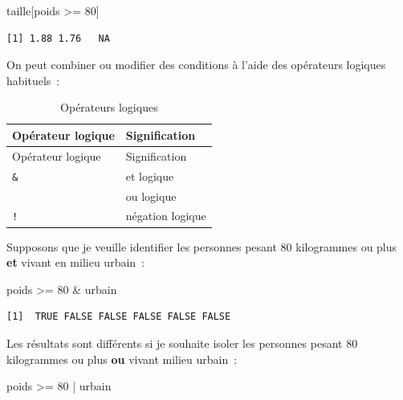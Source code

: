 \documentclass[
  letterpaper,
  DIV=11,
  numbers=noendperiod,
  oneside]{scrreprt}
\newenvironment{Shaded}{\begin{snugshade}}{\end{snugshade}}
\newcommand{\DecValTok}[1]{\textcolor[rgb]{0.68,0.00,0.00}{#1}}
\newcommand{\NormalTok}[1]{\textcolor[rgb]{0.00,0.23,0.31}{#1}}
\newcommand{\SpecialCharTok}[1]{\textcolor[rgb]{0.37,0.37,0.37}{#1}}
\begin{document}
\begin{Shaded}
\begin{Highlighting}[]
\NormalTok{taille[poids }\SpecialCharTok{\textgreater{}=} \DecValTok{80}\NormalTok{]}
\end{Highlighting}
\end{Shaded}

\begin{verbatim}
[1] 1.88 1.76   NA
\end{verbatim}

On peut combiner ou modifier des conditions à l'aide des opérateurs
logiques habituels~:

\hypertarget{tbl-operateurs-logiques}{}
\begin{longtable}[]{@{}ll@{}}
\caption{\label{tbl-operateurs-logiques}Opérateurs
logiques}\tabularnewline
\toprule()
Opérateur logique & Signification \\
\midrule()
\endfirsthead
\toprule()
Opérateur logique & Signification \\
\midrule()
\endhead
\texttt{\&} & et logique \\
\texttt{\textbar{}} & ou logique \\
\texttt{!} & négation logique \\
\bottomrule()
\end{longtable}

Supposons que je veuille identifier les personnes pesant 80 kilogrammes
ou plus \textbf{et} vivant en milieu urbain~:

\begin{Shaded}
\begin{Highlighting}[]
\NormalTok{poids }\SpecialCharTok{\textgreater{}=} \DecValTok{80} \SpecialCharTok{\&}\NormalTok{ urbain}
\end{Highlighting}
\end{Shaded}

\begin{verbatim}
[1]  TRUE FALSE FALSE FALSE FALSE FALSE
\end{verbatim}

Les résultats sont différents si je souhaite isoler les personnes pesant
80 kilogrammes ou plus \textbf{ou} vivant milieu urbain~:

\begin{Shaded}
\begin{Highlighting}[]
\NormalTok{poids }\SpecialCharTok{\textgreater{}=} \DecValTok{80} \SpecialCharTok{|}\NormalTok{ urbain}
\end{Highlighting}
\end{Shaded}
\end{document}
